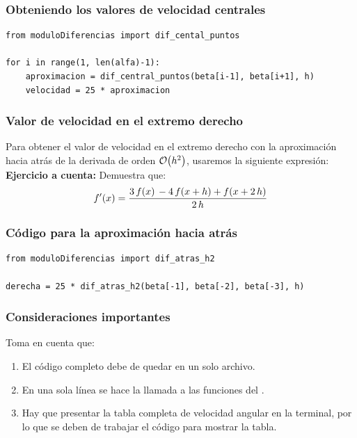 \documentclass[12pt]{beamer}
\begin{document}
\begin{frame}[fragile]
\frametitle{Obteniendo los valores de velocidad centrales}
\begin{lstlisting}[caption=Código para obtener los valores de velocidad centrales]
from moduloDiferencias import dif_cental_puntos

for i in range(1, len(alfa)-1):
    aproximacion = dif_central_puntos(beta[i-1], beta[i+1], h)
    velocidad = 25 * aproximacion
\end{lstlisting}
\end{frame}
\begin{frame}
\frametitle{Valor de velocidad en el extremo derecho}
Para obtener el valor de velocidad en el extremo derecho con la aproximación hacia atrás de la derivada de orden $\order{h^{2}}$, usaremos la siguiente expresión:
\\
\bigskip
\pause
\textbf{Ejercicio a cuenta:} Demuestra que:
\begin{align*}
{f}^{\prime} (x) = \dfrac{3 \, f (x) \, - 4 \, f (x + h) + f (x + 2 \, h)}{2 \, h}
\end{align*}
\end{frame}
\begin{frame}[fragile]
\frametitle{Código para la aproximación hacia atrás}
\begin{lstlisting}[caption=Código para la aproximación hacia atrás de la derivada]
from moduloDiferencias import dif_atras_h2

derecha = 25 * dif_atras_h2(beta[-1], beta[-2], beta[-3], h)
\end{lstlisting}
\end{frame}
\begin{frame}
\frametitle{Consideraciones importantes}
Toma en cuenta que: 
\begin{enumerate}[<+->]
\item El código completo debe de quedar en un solo archivo.
\item En una sola línea se hace la llamada a las funciones del .
\item Hay que presentar la tabla completa de velocidad angular en la terminal, por lo que se deben de trabajar el código para mostrar la tabla.
\seti
\end{enumerate}
\end{frame}
\end{document}
